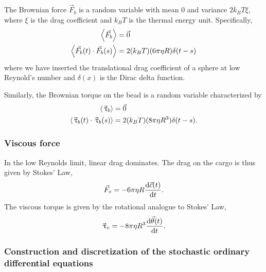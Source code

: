 The Brownian force $\vec{F}_b$ is a random variable with mean 0 and variance $2 k_B T \xi$, where $\xi$ is the drag coefficient and $k_B T$ is the thermal energy unit. Specifically,
\begin{align} \label{eq:Brownian_force}
\ev{\vec{F}_b} &= \vec{0} \\
\ev{\vec{F}_b(t) \cdot \vec{F}_b(s)} &= 2 (k_B T) (6 \pi \eta R) \delta(t-s)
\end{align}
where we have inserted the translational drag coefficient of a sphere at low Reynold's number and $\delta(x)$ is the Dirac delta function.

Similarly, the Brownian torque on the bead is a random variable characterized by
\begin{align} \label{eq:Brownian_torque}
\ev{\vec{\tau}_b} &= \vec{0} \\
\ev{\vec{\tau}_b(t) \cdot \vec{\tau}_b(s)} &= 2 (k_B T)(8 \pi \eta R^3) \delta(t-s).
\end{align}

\subsubsection*{Viscous force}

In the low Reynolds  limit, linear drag dominates. The drag on the cargo is thus given by Stokes' Law,
\begin{equation} \label{eq:trans_drag}
\vec{F}_v=-6 \pi \eta R \dv{\vec{c}(t)}{t}.
\end{equation}
The viscous torque is given by the rotational analogue to Stokes' Law,
\begin{equation} \label{eq:rot_drag}
\vec{{\,\uptau}}_v=-8 \pi \eta R^3 \dv{\vec{\theta}(t)}{t}.
\end{equation}

\subsubsection*{Construction and discretization of the stochastic ordinary differential equations}

